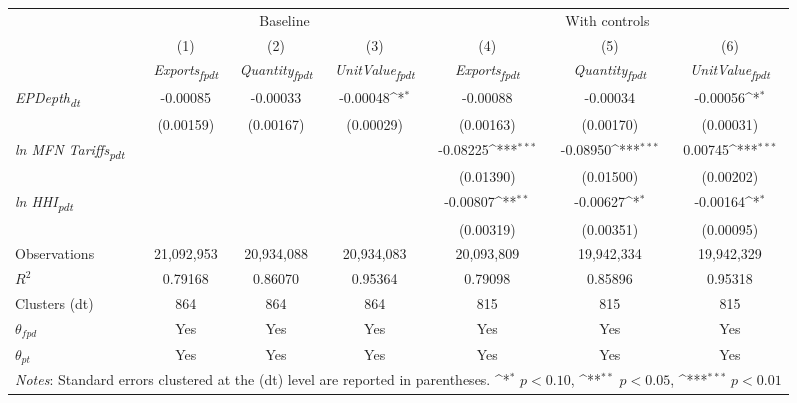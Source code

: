 {
\def\sym#1{\ifmmode^{#1}\else\(^{#1}\)\fi}
\begin{tabular}{l*{6}{c}}
\toprule
&\multicolumn{3}{c}{Baseline}&\multicolumn{3}{c}{With controls}\\\cmidrule(lr){2-4}\cmidrule(lr){5-7}
&(1)&(2)&(3)&(4)&(5)&(6)\\
&\textit{Exports\textsubscript{fpdt}}&\textit{Quantity\textsubscript{fpdt}}&\textit{UnitValue\textsubscript{fpdt}}&\textit{Exports\textsubscript{fpdt}}&\textit{Quantity\textsubscript{fpdt}}&\textit{UnitValue\textsubscript{fpdt}}\\
\midrule
\textit{EPDepth\textsubscript{dt}} & -0.00085 & -0.00033 & -0.00048\sym{*} & -0.00088 & -0.00034 & -0.00056\sym{*}\\
 & (0.00159) & (0.00167) & (0.00029) & (0.00163) & (0.00170) & (0.00031)\\
\addlinespace
\textit{ln MFN Tariffs\textsubscript{pdt}} &  &  &  & -0.08225\sym{***} & -0.08950\sym{***} & 0.00745\sym{***}\\
 &  &  &  & (0.01390) & (0.01500) & (0.00202)\\
\addlinespace
\textit{ln HHI\textsubscript{pdt}} &  &  &  & -0.00807\sym{**} & -0.00627\sym{*} & -0.00164\sym{*}\\
 &  &  &  & (0.00319) & (0.00351) & (0.00095)\\
\midrule
Observations & 21,092,953 & 20,934,088 & 20,934,083 & 20,093,809 & 19,942,334 & 19,942,329\\
$R^{2}$ & 0.79168 & 0.86070 & 0.95364 & 0.79098 & 0.85896 & 0.95318\\
Clusters (dt) & 864 & 864 & 864 & 815 & 815 & 815\\
$\theta_{fpd}$ & Yes & Yes & Yes & Yes & Yes & Yes\\
$\theta_{pt}$ & Yes & Yes & Yes & Yes & Yes & Yes\\
\bottomrule
\multicolumn{7}{l}{\footnotesize \textit{Notes}: Standard errors clustered at the (dt) level are reported in parentheses. \sym{*} \(p<0.10\), \sym{**} \(p<0.05\), \sym{***} \(p<0.01\)}\\
\end{tabular}
}
